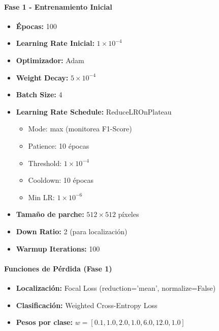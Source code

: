 \paragraph{Fase 1 - Entrenamiento Inicial}
\begin{itemize}
    \item \textbf{Épocas:} 100
    \item \textbf{Learning Rate Inicial:} $1 \times 10^{-4}$
    \item \textbf{Optimizador:} Adam
    \item \textbf{Weight Decay:} $5 \times 10^{-4}$
    \item \textbf{Batch Size:} 4
    \item \textbf{Learning Rate Schedule:} ReduceLROnPlateau
    \begin{itemize}
        \item Mode: max (monitorea F1-Score)
        \item Patience: 10 épocas
        \item Threshold: $1 \times 10^{-4}$
        \item Cooldown: 10 épocas
        \item Min LR: $1 \times 10^{-6}$
    \end{itemize}
    \item \textbf{Tamaño de parche:} $512 \times 512$ píxeles
    \item \textbf{Down Ratio:} 2 (para localización)
    \item \textbf{Warmup Iterations:} 100
\end{itemize}

\paragraph{Funciones de Pérdida (Fase 1)}
\begin{itemize}
    \item \textbf{Localización:} Focal Loss (reduction='mean', normalize=False)
    \item \textbf{Clasificación:} Weighted Cross-Entropy Loss
    \item \textbf{Pesos por clase:} $w = [0.1, 1.0, 2.0, 1.0, 6.0, 12.0, 1.0]$
\end{itemize}

